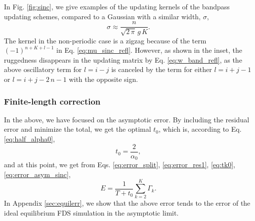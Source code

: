 \documentclass[reprint, floatfix]{revtex4-1}
\begin{document}
In Fig. \ref{fig:sinc},
we give examples of the updating kernels
of the bandpass updating schemes,
compared to a Gaussian
with a similar width, $\sigma$,
%
\begin{equation}
  \sigma
  \approx
  \frac
  {
    n
  }
  {
    \sqrt{ 2 \, \pi } \, g \, K
  }
  .
\label{eq:sigma_equiv}
\end{equation}
%
%
The kernel in the non-periodic case is a zigzag
because of the term $(-1)^{n+K+l-1}$
in Eq. \eqref{eq:mu_sinc_refl}.
%
However, as shown in the inset, %
the ruggedness disappears
in the updating matrix by Eq. \eqref{eq:w_band_refl},
as the above oscillatory term for $l = i - j$
is canceled by the term for either $l = i + j - 1$
or $l = i + j - 2 \, n - 1$
with the opposite sign.



\subsubsection{\label{sec:finlencorr}
Finite-length correction}



In the above, we have focused on
the asymptotic error.
%
By including the residual error
and minimize the total,
we get the optimal $t_0$,
which is, according to Eq. \eqref{eq:half_alpha0},
%
%
\begin{equation}
  t_0
  =
  \frac{     2    }
       { \alpha_0 }
  ,
\label{eq:t0_sinc}
\end{equation}
%
and at this point, we get
from Eqs. \eqref{eq:error_split},
\eqref{eq:error_res1},
\eqref{eq:tk0},
\eqref{eq:error_asym_sinc},
%
\begin{equation}
  E
  =
  \frac{   1     }
       { T + t_0 }
  \sum_{ k = 2 }^K
    \Gamma_k
  .
\label{eq:error_sinc}
\end{equation}
%
In Appendix \ref{sec:equilerr},
we show that the above error tends
to the error of the ideal equilibrium FDS simulation
in the asymptotic limit.
\end{document}
